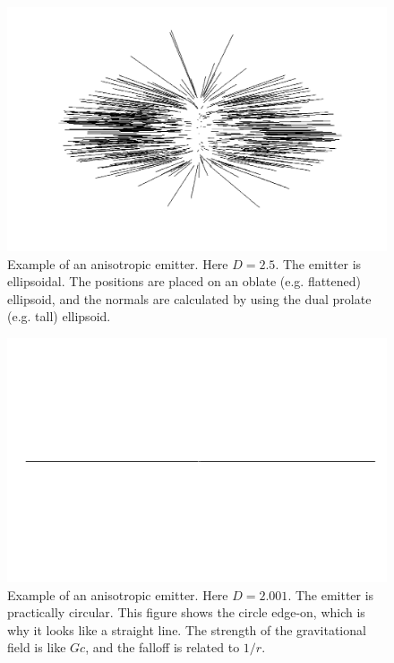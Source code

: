 \documentclass[12pt]{article}
\begin{document}
\begin{figure} 
\centering
  \includegraphics[width = 5 in]{2.5.png}
  \caption{
Example of an anisotropic emitter.
Here $D = 2.5$. 
The emitter is ellipsoidal.
The positions are placed on an oblate (e.g. flattened) ellipsoid, and the normals are calculated by using the dual prolate (e.g. tall) ellipsoid.
}
\end{figure}


\begin{figure} 
\centering
  \includegraphics[width = 5 in]{2.png}
  \caption{
Example of an anisotropic emitter.
Here $D = 2.001$. 
The emitter is practically circular. 
This figure shows the circle edge-on, which is why it looks like a straight line.
The strength of the gravitational field is like $Gc$, and the falloff is related to $1/r$.
}
\end{figure}
\end{document}
